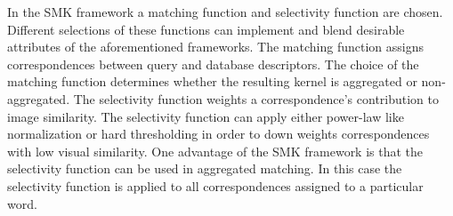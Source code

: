 





        In the SMK framework a matching function and selectivity function are chosen. Different selections of these
        functions can implement and blend desirable attributes of the aforementioned frameworks. The matching function
        assigns correspondences between query and database descriptors. The choice of the matching function determines
        whether the resulting kernel is aggregated or non-aggregated. The selectivity function weights a
        correspondence's contribution to image similarity. The selectivity function can apply either power-law like
        normalization or hard thresholding in order to down weights correspondences with low visual similarity. One
        advantage of the SMK framework is that the selectivity function can be used in aggregated matching. In this case
        the selectivity function is applied to all correspondences assigned to a particular word.

